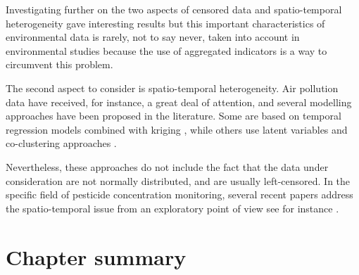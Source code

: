 Investigating further on the two aspects of censored data and spatio-temporal heterogeneity gave interesting results but this important characteristics of environmental data is rarely, not to say never, taken into account in environmental studies because the use of aggregated indicators is a way to circumvent this problem. 

The second aspect to consider is spatio-temporal heterogeneity. Air pollution data have received, for instance, a great deal of attention, and several modelling approaches have been proposed in the literature. Some are based on temporal regression models combined with kriging \citep{sampson2011,lindstrom2014flexible}, while others use latent variables and co-clustering approaches \citep{bouveyron2021co}. 

Nevertheless, these approaches do not include the fact that the data under consideration are not normally distributed, and are usually left-censored. In the specific field of pesticide concentration monitoring, several recent papers address the spatio-temporal issue from an exploratory point of view see for instance \cite{masia2016,figueiredo2021spatio,aznar2017spatio}. 





\clearpage

\section{Chapter summary}

